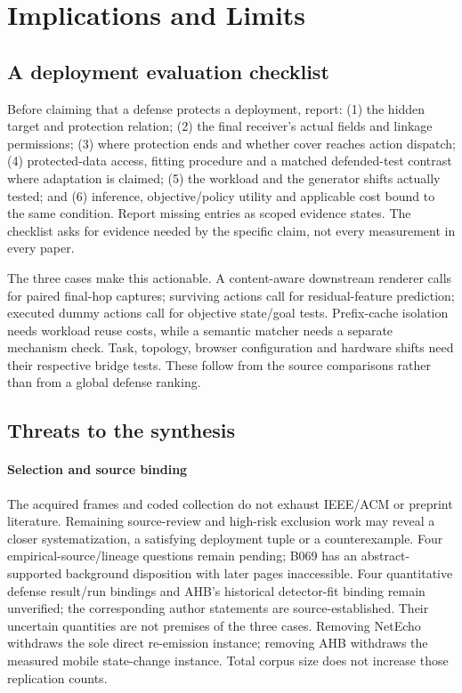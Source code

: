 \section{Implications and Limits}\label{sec:agenda}
\subsection{A deployment evaluation checklist}
Before claiming that a defense protects a deployment, report: (1) the hidden target and protection relation; (2) the final receiver's actual fields and linkage permissions; (3) where protection ends and whether cover reaches action dispatch; (4) protected-data access, fitting procedure and a matched defended-test contrast where adaptation is claimed; (5) the workload and the generator shifts actually tested; and (6) inference, objective/policy utility and applicable cost bound to the same condition. Report missing entries as scoped evidence states. The checklist asks for evidence needed by the specific claim, not every measurement in every paper.

The three cases make this actionable. A content-aware downstream renderer calls for paired final-hop captures; surviving actions call for residual-feature prediction; executed dummy actions call for objective state/goal tests. Prefix-cache isolation needs workload reuse costs, while a semantic matcher needs a separate mechanism check. Task, topology, browser configuration and hardware shifts need their respective bridge tests. These follow from the source comparisons rather than from a global defense ranking.

\subsection{Threats to the synthesis}
\paragraph{Selection and source binding}
The acquired frames and coded collection do not exhaust IEEE/ACM or preprint literature. Remaining source-review and high-risk exclusion work may reveal a closer systematization, a satisfying deployment tuple or a counterexample. Four empirical-source/lineage questions remain pending; B069 has an abstract-supported background disposition with later pages inaccessible. Four quantitative defense result/run bindings and AHB's historical detector-fit binding remain unverified; the corresponding author statements are source-established. Their uncertain quantities are not premises of the three cases. Removing NetEcho withdraws the sole direct re-emission instance; removing AHB withdraws the measured mobile state-change instance. Total corpus size does not increase those replication counts.

